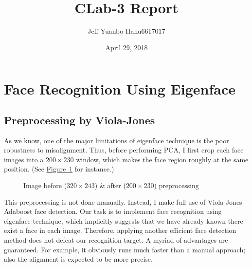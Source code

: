 \documentclass{article}
\title{CLab-3 Report}
\author{Jeff Yuanbo Han\quad u6617017}
\date{April 29, 2018}
\theoremstyle{plain} \newtheorem{prop}{Proposition}
\begin{document}
\maketitle
\tableofcontents

\section{Face Recognition Using Eigenface}
\subsection{Preprocessing by Viola-Jones}
As we know, one of the major limitations of eigenface technique is the poor robustness to misalignment. Thus, before performing PCA, I first crop each face images into a  $200\times230$ window, which makes the face region roughly at the same position. (See \hyperref[fig-1]{Figure~1} for instance.)

\begin{figure}
	\centering
	\caption{Image before ($320\times243$) \& after ($200\times230$) preprocessing}
	\label{fig-1}
\end{figure}

This preprocessing is not done manually. Instead, I make full use of Viola-Jones Adaboost face detection. Our task is to implement face recognition using eigenface technique, which implicitly suggests that we have already known there exist a face in each image. Therefore, applying another efficient face detection method does not defeat our recognition target. A myriad of advantages are guaranteed. For example, it obviously runs much faster than a manual approach; also the alignment is expected to be more precise.
\end{document}
